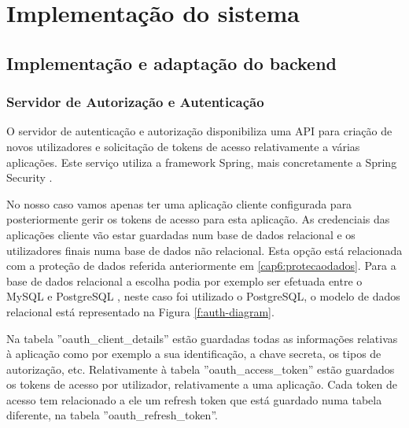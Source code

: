 \chapter{Implementação do sistema}

\section{Implementação e adaptação do backend}
\subsection{Servidor de Autorização e Autenticação}
O servidor de autenticação e autorização disponibiliza uma \gls{API} para criação de novos utilizadores e solicitação de tokens de acesso relativamente a várias aplicações. Este serviço utiliza a framework Spring, mais concretamente a Spring Security \cite{spring-framework}. \par 
No nosso caso vamos apenas ter uma aplicação cliente configurada para posteriormente gerir os tokens de acesso para esta aplicação. As credenciais das aplicações cliente vão estar guardadas num base de dados relacional e os utilizadores finais numa base de dados não relacional. Esta opção está relacionada com a proteção de dados referida anteriormente em \ref{cap6:protecaodados}. Para a base de dados relacional a escolha podia por exemplo ser efetuada entre o MySQL \cite{mysql} e PostgreSQL \cite{postgresql}, neste caso foi utilizado o PostgreSQL, o modelo de dados relacional está representado na Figura \ref{f:auth-diagram}. \par 
Na tabela ''oauth\_client\_details'' estão guardadas todas as informações relativas à aplicação como por exemplo a sua identificação, a chave secreta, os tipos de autorização, etc. Relativamente à tabela ''oauth\_access\_token'' estão guardados os tokens de acesso por utilizador, relativamente a uma aplicação. Cada token de acesso tem relacionado a ele  um refresh token que está guardado numa tabela diferente, na tabela ''oauth\_refresh\_token''.

